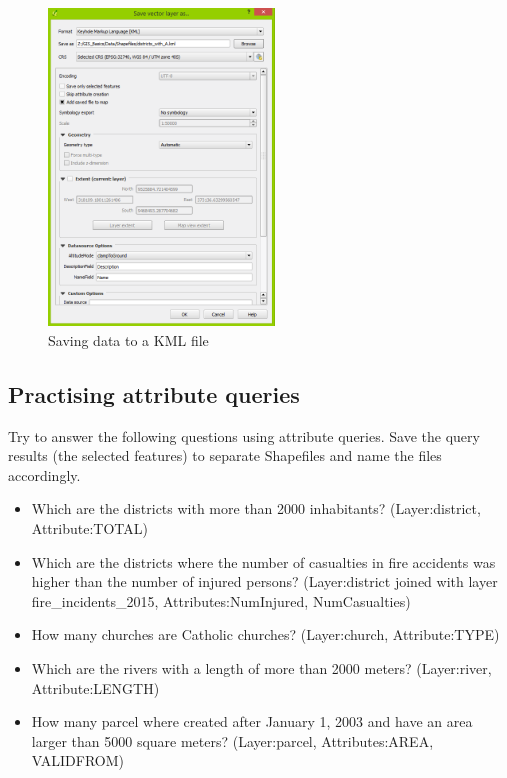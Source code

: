 \documentclass[a4paper,12pt,titlepage]{article}
\begin{document}
\begin{figure}[htb]
\centering
\includegraphics[width=6cm]{Images/kml.png}
\caption{Saving data to a KML file}\label{fig:kml}
\end{figure}

\subsection{Practising attribute queries}
Try to answer the following questions using attribute queries. Save the query results (the selected features) to separate Shapefiles and name the files accordingly.

\begin{itemize}
\item Which are the districts with more than 2000 inhabitants? (Layer:district, Attribute:TOTAL) 
\item Which are the districts where the number of casualties in fire accidents was higher than the number of injured persons? (Layer:district joined with layer fire\_incidents\_2015, Attributes:NumInjured, NumCasualties)
\item How many churches are Catholic churches? (Layer:church, Attribute:TYPE)
\item Which are the rivers with a length of more than 2000 meters? (Layer:river, Attribute:LENGTH)
\item How many parcel where created after January 1, 2003 and have an area larger than 5000 square meters? (Layer:parcel, Attributes:AREA, VALIDFROM)
\end{itemize}

\end{document}

